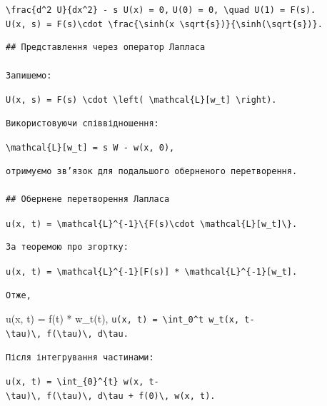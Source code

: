 \documentclass[
  ukrainian,
]{article}
\begin{document}
\texttt{\textbackslash{}frac\{d\^{}2\ U\}\{dx\^{}2\}\ -\ s\ U(x)\ =\ 0,}
\texttt{U(0)\ =\ 0,\ \textbackslash{}quad\ U(1)\ =\ F(s).}
\texttt{U(x,\ s)\ =\ F(s)\textbackslash{}cdot\ \textbackslash{}frac\{\textbackslash{}sinh(x\ \textbackslash{}sqrt\{s\})\}\{\textbackslash{}sinh(\textbackslash{}sqrt\{s\})\}.}

\begin{verbatim}
## Представлення через оператор Лапласа

Запишемо:
\end{verbatim}

\texttt{U(x,\ s)\ =\ F(s)\ \textbackslash{}cdot\ \textbackslash{}left(\ \textbackslash{}mathcal\{L\}{[}w\_t{]}\ \textbackslash{}right).}

\begin{verbatim}
Використовуючи співвідношення:
\end{verbatim}

\texttt{\textbackslash{}mathcal\{L\}{[}w\_t{]}\ =\ s\ W\ -\ w(x,\ 0),}

\begin{verbatim}
отримуємо зв’язок для подальшого оберненого перетворення.

## Обернене перетворення Лапласа
\end{verbatim}

\texttt{u(x,\ t)\ =\ \textbackslash{}mathcal\{L\}\^{}\{-1\}\textbackslash{}\{F(s)\textbackslash{}cdot\ \textbackslash{}mathcal\{L\}{[}w\_t{]}\textbackslash{}\}.}

\begin{verbatim}
За теоремою про згортку:
\end{verbatim}

\texttt{u(x,\ t)\ =\ \textbackslash{}mathcal\{L\}\^{}\{-1\}{[}F(s){]}\ *\ \textbackslash{}mathcal\{L\}\^{}\{-1\}{[}w\_t{]}.}

\begin{verbatim}
Отже,
\end{verbatim}

u(x, t) = f(t) * w\_t(t),
\texttt{u(x,\ t)\ =\ \textbackslash{}int\_0\^{}t\ w\_t(x,\ t-\textbackslash{}tau)\textbackslash{},\ f(\textbackslash{}tau)\textbackslash{},\ d\textbackslash{}tau.}

\begin{verbatim}
Після інтегрування частинами:
\end{verbatim}

\texttt{u(x,\ t)\ =\ \textbackslash{}int\_\{0\}\^{}\{t\}\ w(x,\ t-\textbackslash{}tau)\textbackslash{},\ f\textquotesingle{}(\textbackslash{}tau)\textbackslash{},\ d\textbackslash{}tau\ +\ f(0)\textbackslash{},\ w(x,\ t).}
\end{document}
